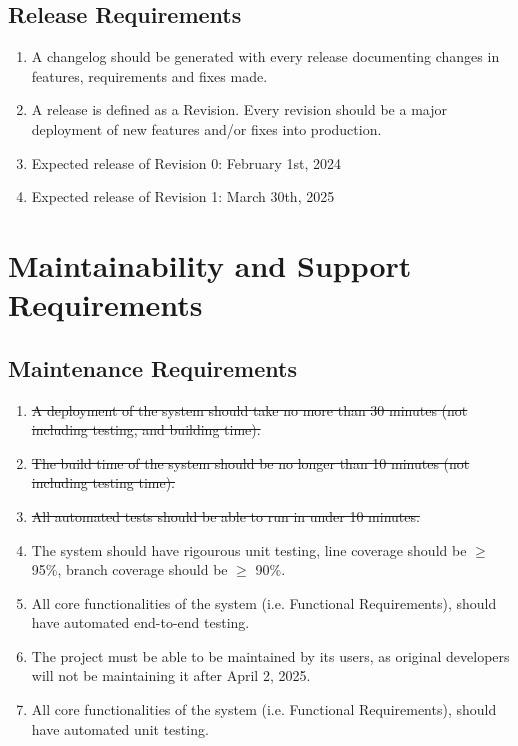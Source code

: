 \documentclass[12pt]{article}
\begin{document}
\subsection{Release Requirements}
\begin{enumerate} [{OE-REL}1.]
  \item A changelog should be generated with every release
    documenting changes in features, requirements and fixes made.
  \item A release is defined as a Revision. Every revision should be
    a major deployment of new features and/or fixes into production.
  \item Expected release of Revision 0: February 1st, 2024
  \item Expected release of Revision 1: March 30th, 2025
\end{enumerate}

\section{Maintainability and Support Requirements}
\subsection{Maintenance Requirements}
\begin{enumerate} [{MS-MTN}1.]
  \item \sout{A deployment of the system should take no more than 30 minutes (not
    including testing, and building time).}
  \item \sout{The build time of the system should be no longer than 10 minutes (not
    including testing time).}
  \item \sout{All automated tests should be able to run in under 10 minutes.}
  \item The system should have rigourous unit testing, line coverage should be
    $\ge$ 95\%, branch coverage should be $\ge$ 90\%.
  \item All core functionalities of the system (i.e. Functional Requirements),
    should have automated end-to-end testing.
  \item The project must be able to be maintained by its users, as original
    developers will not be maintaining it after April 2, 2025.
  \item All core functionalities of the system (i.e. Functional Requirements),
    should have automated unit testing.
\end{enumerate}
\end{document}
